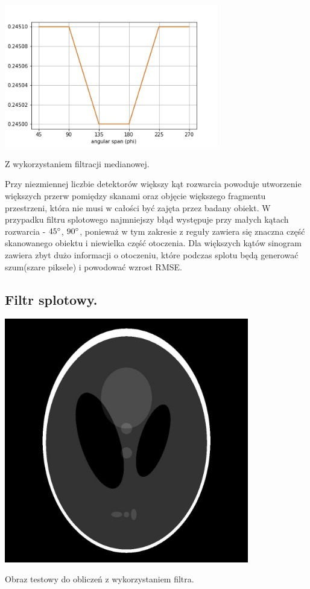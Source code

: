\documentclass[a4paper, 11pt]{article}
\begin{document}
\begin{center}
	\includegraphics[width=0.7\textwidth]{phi_no_convolve.png}
	
	Z wykorzystaniem filtracji medianowej.
\end{center}


Przy niezmiennej liczbie detektorów większy kąt rozwarcia powoduje utworzenie większych przerw pomiędzy skanami oraz objęcie większego fragmentu przestrzeni, która nie musi w całości być zajęta przez badany obiekt. W przypadku filtru splotowego najmniejszy błąd występuje przy małych kątach rozwarcia - $45\degree$, $90\degree$, ponieważ w tym zakresie z reguły zawiera się znaczna część skanowanego obiektu i niewielka część otoczenia. Dla większych kątów sinogram zawiera zbyt dużo informacji o otoczeniu, które podczas splotu będą generować szum(szare piksele) i powodować wzrost RMSE.


\subsection{Filtr splotowy.}
\begin{center}
	\includegraphics[width=0.8\textwidth]{phantom.png}


	Obraz testowy do obliczeń z wykorzystaniem filtra.
\end{center}
\end{document}
